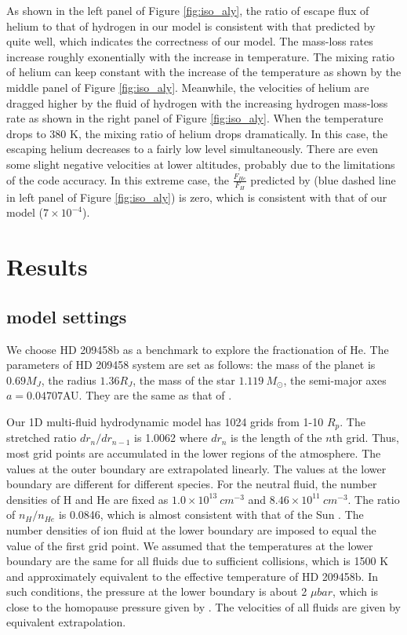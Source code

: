 \documentclass[journal, onecolumn]{aastex631}
\begin{document}
\begin{CJK*}{UTF8}{gbsn}
As shown in the left panel of Figure \ref{fig:iso_aly}, the ratio of escape flux of helium to that of hydrogen in our model is consistent with that predicted by \cite{Hunten1987} quite well, which indicates the correctness of our model. The mass-loss rates increase roughly exonentially with the increase in temperature. The mixing ratio of helium can keep constant with the increase of the temperature as shown by the middle panel of Figure \ref{fig:iso_aly}. Meanwhile, the velocities of helium are dragged higher by the fluid of hydrogen with the increasing hydrogen mass-loss rate as shown in the right panel of Figure \ref{fig:iso_aly}. When the temperature drops to 380 K, the mixing ratio of helium drops dramatically. In this case, the escaping helium decreases to a fairly low level simultaneously. There are even some slight negative velocities at lower altitudes, probably due to the limitations of the code accuracy. In this extreme case, the $\frac{F_{He}}{F_{H}}$ predicted by \cite{Hunten1987}(blue dashed line in left panel of Figure \ref{fig:iso_aly}) is zero, which is consistent with that of our model ($7\times 10^{-4}$).





\section{Results} \label{sec:results}

\subsection{model settings} \label{subsec:setting}
We choose HD 209458b as a benchmark to explore the fractionation of He. The parameters of HD 209458 system are set as follows: the mass of the planet is  $0.69M_J$, the radius $1.36R_J$, the mass of the star $ 1.119\ M_{\odot}$, the semi-major axes $a = 0.04707$AU. They are the same as that of \cite{Lampon2020}.

Our 1D multi-fluid hydrodynamic model has 1024 grids from 1-10 $R_{p}$. The stretched ratio $dr_{n}/dr_{n-1}$ is 1.0062 where $dr_{n}$ is the length of the $n$th grid. Thus, most grid points are accumulated in the lower regions of the atmosphere. The values at the outer boundary are extrapolated linearly. The values at the lower boundary are different for different species. For the neutral fluid, the number densities of H and He are fixed as $1.0\times 10^{13}\ cm^{-3}$ and $8.46 \times 10^{11}\ cm^{-3}$. The ratio of $n_H/n_{He}$ is 0.0846, which is almost consistent with that of the Sun \citep{Asplund2009}. The number densities of ion fluid at the lower boundary are imposed to equal the value of the first grid point. We assumed that the temperatures at the lower boundary are the same for all fluids due to sufficient collisions, which is 1500 K and approximately equivalent to the effective temperature of HD 209458b. In such conditions, the pressure at the lower boundary is about 2 $\mu bar$, which is close to the homopause pressure given by \cite{Garcia2007}. The velocities of all fluids are given by equivalent extrapolation.


\end{CJK*}
\end{document}
